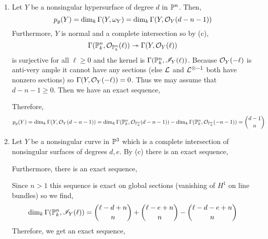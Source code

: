 \documentclass[12pt]{article}
\begin{document}
\begin{enumerate}
\item Let $Y$ be a nonsingular hypersurface of degree $d$ in $\P^n$. Then,
\[ p_g(Y) = \dim_k \Gamma(Y, \omega_Y) = \dim_k \Gamma(Y, \struct{Y}(d - n - 1)) \]
Furthermore, $Y$ is normal and a complete intersection so by (c),
\[ \Gamma(\P^n_k, \struct{\P^n_k}(\ell)) \onto \Gamma(Y, \struct{Y}(\ell)) \]
is surjective for all $\ell \ge 0$ and the kernel is $\Gamma(\P^n_k, \I_Y(\ell))$. Because $\struct{Y}(-\ell)$ is anti-very ample it cannot have any sections (else $\L$ and $\L^{\otimes -1}$ both have nonzero sections) so $\Gamma(Y, \struct{Y}(-\ell)) = 0$. Thus we may assume that $d - n - 1 \ge 0$. Then we have an exact sequence,
\begin{center}
\end{center}
Therefore,
\[ p_g(Y) = \dim_k \Gamma(Y, \struct{Y}(d - n - 1)) = \dim_k \Gamma(\P^n_k, \struct{\P^n_k}(d - n - 1)) - \dim_k \Gamma(\P^n_k, \struct{\P^n_k}(- n - 1)) = { d - 1 \choose n }  \]
\item Let $Y$ be a nonsingular curve in $\P^3$ which is a complete intersection of nonsingular surfaces of degrees $d,e$. By (c) there is an exact sequence,
\begin{center}
\end{center}
Furthermore, there is an exact sequence,
\begin{center}
\end{center}
Since $n > 1$ this sequence is exact on global sections (vanishing of $H^1$ on line bundles) so we find,
\[ \dim_k \Gamma(\P^n_k, \I_Y(\ell)) = { \ell - d + n \choose n } + { \ell - e + n \choose n } - { \ell - d - e + n \choose n } \] Therefore, we get an exact sequence,
\begin{center}
\begin{tikzcd}[column sep = small]

\end{tikzcd}
\end{center}
\end{enumerate}
\end{document}
